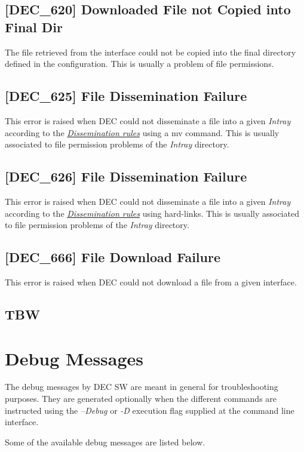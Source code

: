 \documentclass[dec_sum_main.tex]{subfiles}
\begin{document}
\subsection{[DEC\_620] Downloaded File not Copied into Final Dir}
\label{DEC620}
The file retrieved from the interface could not be copied into the final directory defined in the configuration. This is usually a problem of file permissions. 

\subsection{[DEC\_625] File Dissemination Failure}
\label{DEC625}
This error is raised when DEC could not disseminate a file into a given \textit{Intray} according to the \hyperref[Dissemination rules]{\textit{Dissemination rules}} using a mv command. This is usually associated to file permission problems of the \textit{Intray} directory.

\subsection{[DEC\_626] File Dissemination Failure}
\label{DEC625}
This error is raised when DEC could not disseminate a file into a given \textit{Intray} according to the \hyperref[Dissemination rules]{\textit{Dissemination rules}} using hard-links. This is usually associated to file permission problems of the \textit{Intray} directory.

\subsection{[DEC\_666] File Download Failure}
\label{DEC666}
This error is raised when DEC could not download a file from a given interface.

\subsection{TBW}



\section{Debug Messages}
The debug messages by DEC SW are meant in general for troubleshooting purposes. They are generated optionally when the different commands are instructed using the \textit{--Debug} or \textit{-D} execution flag supplied at the command line interface.
\newline
\par
\noindent
Some of the available debug messages are listed below.
\end{document}
